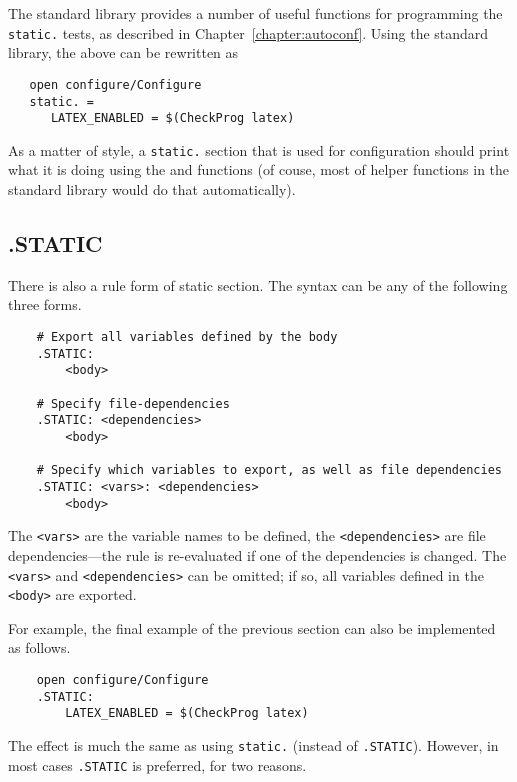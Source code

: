 The \OMake standard library provides a number of useful functions for
programming the \verb+static.+ tests, as described in
Chapter~\ref{chapter:autoconf}. Using the standard library, the above can
be rewritten as

\begin{verbatim}
   open configure/Configure
   static. =
      LATEX_ENABLED = $(CheckProg latex)
\end{verbatim}

As a matter of style, a \verb+static.+ section that is used for configuration should print what it
is doing using the  and
 functions (of couse, most of helper functions in
the standard library would do that automatically).

\subsection{.STATIC}
\label{section:.STATIC}

\newinreorg

There is also a rule form of static section.  The syntax can be any of the following three forms.

\begin{verbatim}
    # Export all variables defined by the body
    .STATIC:
        <body>

    # Specify file-dependencies
    .STATIC: <dependencies>
        <body>

    # Specify which variables to export, as well as file dependencies
    .STATIC: <vars>: <dependencies>
        <body>
\end{verbatim}

The \verb+<vars>+ are the variable names to be defined, the \verb+<dependencies>+ are file
dependencies---the rule is re-evaluated if one of the dependencies is changed.  The \verb+<vars>+
and \verb+<dependencies>+ can be omitted; if so, all variables defined in the \verb+<body>+ are
exported.

For example, the final example of the previous section can also be implemented as follows.

\begin{verbatim}
    open configure/Configure
    .STATIC:
        LATEX_ENABLED = $(CheckProg latex)
\end{verbatim}
%
The effect is much the same as using \verb+static.+ (instead of \verb+.STATIC+).  However, in most
cases \verb+.STATIC+ is preferred, for two reasons.

